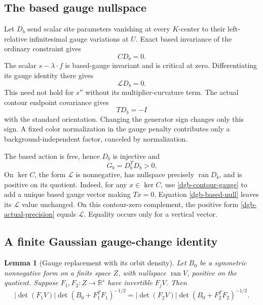 \documentclass[11pt]{article}
\newtheorem{lemma}[theorem]{Lemma}
\theoremstyle{remark}
\begin{document}
\subsection{The based gauge nullspace}
\label{dgb-nullspace-section}

Let $D_b$ send scalar site parameters vanishing at every
$K$-center to their left-relative infinitesimal gauge variations
at $U$. Exact based invariance of the ordinary constraint gives
\begin{equation}
                              CD_b=0.
 \label{dgb-based-constraint}
\end{equation}
The scalar $s-\lambda\cdot f$ is based-gauge invariant and is
critical at zero. Differentiating its gauge identity there gives
\begin{equation}
                              \mathcal L D_b=0.
 \label{dgb-based-null}
\end{equation}
This need not hold for $s''$ without its multiplier-curvature
term. The actual contour endpoint covariance gives
\begin{equation}
                              TD_b=-I
 \label{dgb-contour-gauge}
\end{equation}
with the standard orientation. Changing the generator sign
changes only this sign. A fixed color normalization in the
gauge penalty contributes only a background-independent
factor, canceled by normalization.

The based action is free, hence $D_b$ is injective and
\begin{equation}
                              G_b=D_b^TD_b>0.
 \label{dgb-based-ghost}
\end{equation}
On $\ker C$, the form $\mathcal L$ is nonnegative, has
nullspace precisely $\operatorname{ran}D_b$, and is positive
on its quotient. Indeed, for any $x\in\ker C$, use
\eqref{dgb-contour-gauge} to add a unique based gauge vector
making $Tx=0$. Equation \eqref{dgb-based-null} leaves its
$\mathcal L$ value unchanged. On this contour-zero complement,
the positive form \eqref{dgb-actual-precision} equals
$\mathcal L$. Equality occurs only for a vertical vector.

\subsection{A finite Gaussian gauge-change identity}
\label{dgb-gauge-change-section}

\begin{lemma}[Gauge replacement with its orbit density]
\label{dgb-gauge-lemma}
Let $B_0$ be a symmetric nonnegative form on a finite space
$Z$, with nullspace $\operatorname{ran}V$, positive on the
quotient. Suppose $F_1,F_2:Z\to\mathbb R^s$ have invertible
$F_jV$. Then
\begin{equation}
 |\det(F_1V)|\det(B_0+F_1^TF_1)^{-1/2}
   =|\det(F_2V)|\det(B_0+F_2^TF_2)^{-1/2}.
 \label{dgb-gauge-identity}
\end{equation}
\end{lemma}
\end{document}
